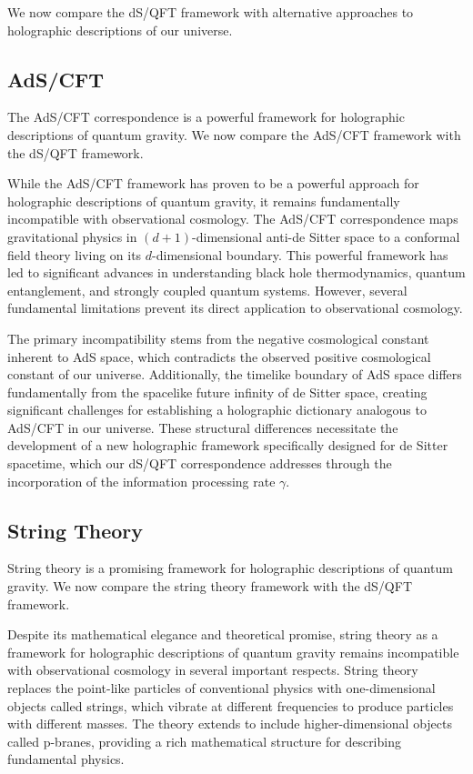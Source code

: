 \documentclass[11pt,english,twoside]{article}
\theoremstyle{plain}
\theoremstyle{definition}
\theoremstyle{remark}
\newcommand{\gammaR}{\gamma}
\begin{document}
We now compare the dS/QFT framework with alternative approaches to holographic descriptions of our universe.

\subsection{AdS/CFT}
\label{subsec:ads_cft}

The AdS/CFT correspondence is a powerful framework for holographic descriptions of quantum gravity. We now compare the AdS/CFT framework with the dS/QFT framework.

While the AdS/CFT framework has proven to be a powerful approach for holographic descriptions of quantum gravity, it remains fundamentally incompatible with observational cosmology. The AdS/CFT correspondence maps gravitational physics in $(d+1)$-dimensional anti-de Sitter space to a conformal field theory living on its $d$-dimensional boundary. This powerful framework has led to significant advances in understanding black hole thermodynamics, quantum entanglement, and strongly coupled quantum systems. However, several fundamental limitations prevent its direct application to observational cosmology.

The primary incompatibility stems from the negative cosmological constant inherent to AdS space, which contradicts the observed positive cosmological constant of our universe. Additionally, the timelike boundary of AdS space differs fundamentally from the spacelike future infinity of de Sitter space, creating significant challenges for establishing a holographic dictionary analogous to AdS/CFT in our universe. These structural differences necessitate the development of a new holographic framework specifically designed for de Sitter spacetime, which our dS/QFT correspondence addresses through the incorporation of the information processing rate $\gammaR$.

\subsection{String Theory}
\label{subsec:string_theory}

String theory is a promising framework for holographic descriptions of quantum gravity. We now compare the string theory framework with the dS/QFT framework.

Despite its mathematical elegance and theoretical promise, string theory as a framework for holographic descriptions of quantum gravity remains incompatible with observational cosmology in several important respects. String theory replaces the point-like particles of conventional physics with one-dimensional objects called strings, which vibrate at different frequencies to produce particles with different masses. The theory extends to include higher-dimensional objects called p-branes, providing a rich mathematical structure for describing fundamental physics.
\end{document}
